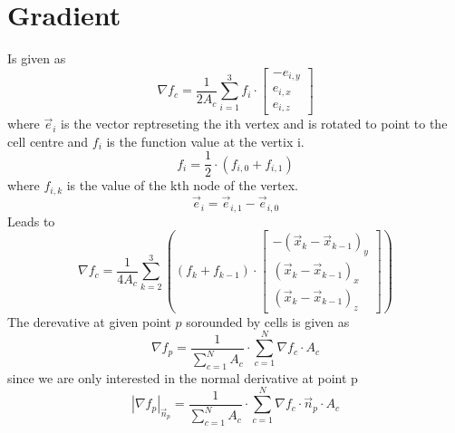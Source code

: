 \section{Gradient}
Is given as
\begin{equation}
  \nabla f_c = \frac{1}{2 A_c} \sum_{i = 1}^3 f_i \cdot
  \begin{bmatrix}
    -e_{i, y} \\
    e_{i, x} \\
    e_{i, z}
  \end{bmatrix}
\end{equation}
where $\vec{e}_i$ is the vector reptreseting the ith vertex and is rotated to point to the cell centre and $f_i$ is the function value at the vertix i.
\begin{equation}
  f_i = \frac{1}{2} \cdot (f_{i, 0} + f_{i, 1})
\end{equation}
where $f_{i, k}$ is the value of the kth node of the vertex.
\begin{equation}
  \vec{e}_i = \vec{e}_{i, 1} - \vec{e}_{i, 0}
\end{equation}
Leads to
\begin{equation}
  \nabla f_c = \frac{1}{4 A_c} \sum_{k = 2}^3 \left( (f_k + f_{k - 1}) \cdot
  \begin{bmatrix}
    -(\vec{x}_{k} - \vec{x}_{k - 1})_y\\
    (\vec{x}_{k} - \vec{x}_{k - 1})_x \\
    (\vec{x}_{k} - \vec{x}_{k - 1})_z
  \end{bmatrix}
  \right)
\end{equation}
The derevative at given point $p$ sorounded by cells is given as
\begin{equation}
  \nabla f_p = \frac{1}{\sum_{c = 1}^N A_c} \cdot \sum_{c = 1}^N \nabla f_c \cdot A_c
\end{equation}
since we are only interested in the normal derivative at point p
\begin{equation}
  \left|\nabla f_p\right|_{\vec{n}_p} = \frac{1}{\sum_{c = 1}^N A_c} \cdot \sum_{c = 1}^N \nabla f_c \cdot \vec{n}_p \cdot A_c
\end{equation}

